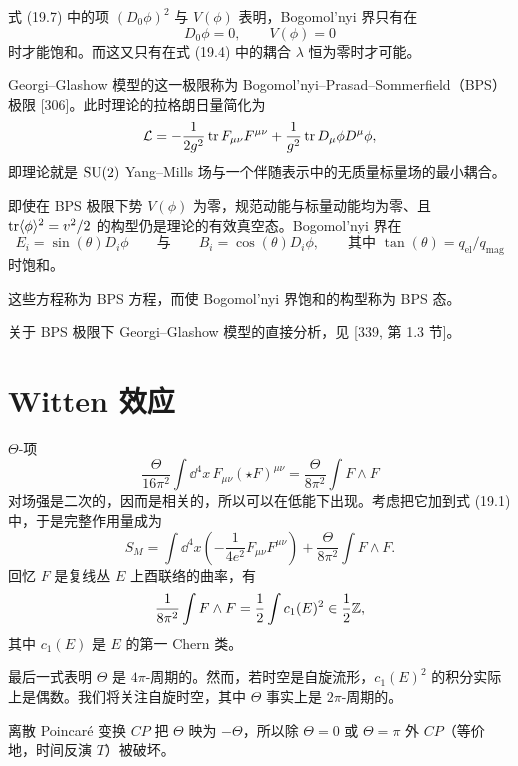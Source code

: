 式 (19.7) 中的项 $(D_0\phi)^2$ 与 $V(\phi)$ 表明，Bogomol'nyi 界只有在
\[
D_0\phi=0,\qquad V(\phi)=0
\]
时才能饱和。而这又只有在式 (19.4) 中的耦合 $\lambda$ 恒为零时才可能。

\begin{definition}[19.11]
Georgi--Glashow 模型的这一极限称为 Bogomol'nyi--Prasad--Sommerfield（BPS）极限 [306]。此时理论的拉格朗日量简化为
\[
\mathcal{L}=-\frac{1}{2g^2}\operatorname{tr} F_{\mu\nu}F^{\mu\nu}+\frac{1}{g^2}\operatorname{tr} D_\mu\phi D^\mu\phi,
\]
即理论就是 $\operatorname{SU}(2)$ Yang--Mills 场与一个伴随表示中的无质量标量场的最小耦合。
\end{definition}

即使在 BPS 极限下势 $V(\phi)$ 为零，规范动能与标量动能均为零、且 $\operatorname{tr}\langle\phi\rangle^2=v^2/2$ 的构型仍是理论的有效真空态。Bogomol'nyi 界在
\[
E_i=\sin(\theta)D_i\phi
\qquad\text{与}\qquad
B_i=\cos(\theta)D_i\phi,\qquad\text{其中 } \tan(\theta)=q_{\mathrm{el}}/q_{\mathrm{mag}}
\]
时饱和。

\begin{definition}[19.12]
这些方程称为 BPS 方程，而使 Bogomol'nyi 界饱和的构型称为 BPS 态。
\end{definition}


关于 BPS 极限下 Georgi--Glashow 模型的直接分析，见 [339, 第 1.3 节]。

\section{Witten 效应}

$\Theta$-项
\[
\frac{\Theta}{16\pi^2}\int \dd^4x\,F_{\mu\nu}(\star F)^{\mu\nu}
=\frac{\Theta}{8\pi^2}\int F\wedge F
\]
对场强是二次的，因而是相关的，所以可以在低能下出现。考虑把它加到式 (19.1) 中，于是完整作用量成为
\[
S_M=\int \dd^4x\left(-\frac{1}{4e^2}F_{\mu\nu}F^{\mu\nu}\right)
+\frac{\Theta}{8\pi^2}\int F\wedge F .
\]
回忆 $F$ 是复线丛 $E$ 上酉联络的曲率，有
\[
\frac{1}{8\pi^2}\int F\wedge F=\frac{1}{2}\int c_1(E)^2\in\frac{1}{2}\mathbb{Z},
\]
其中 $c_1(E)$ 是 $E$ 的第一 Chern 类。

\begin{remark}[19.13]
最后一式表明 $\Theta$ 是 $4\pi$-周期的。然而，若时空是自旋流形，$c_1(E)^2$ 的积分实际上是偶数。我们将关注自旋时空，其中 $\Theta$ 事实上是 $2\pi$-周期的。
\end{remark}

\begin{remark}[19.14]
离散 Poincaré 变换 $CP$ 把 $\Theta$ 映为 $-\Theta$，所以除 $\Theta=0$ 或 $\Theta=\pi$ 外 $CP$（等价地，时间反演 $T$）被破坏。
\end{remark}

